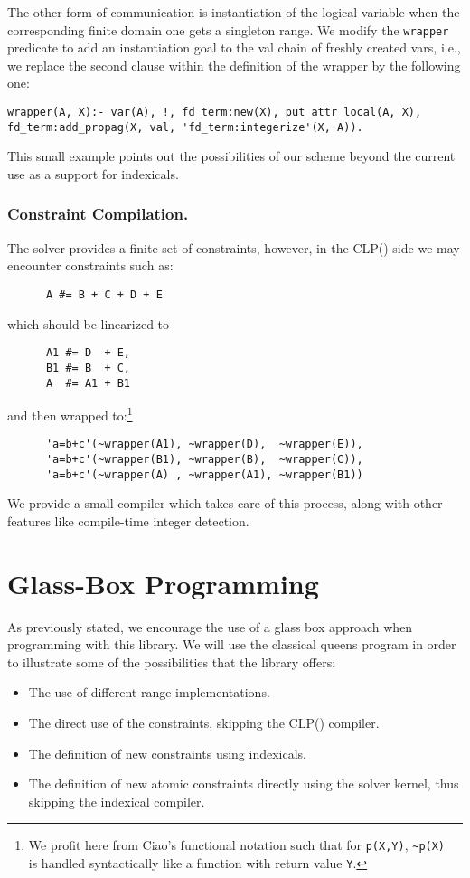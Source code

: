 \documentclass{llncs}
\newcommand{\clpfd}{CLP()\xspace}
\newcommand{\fd}{\xspace}
\begin{document}
The other form of communication is instantiation of the logical
variable when the corresponding finite domain one gets a singleton
range. We modify the \verb!wrapper! predicate to add an instantiation
goal to the val chain of freshly created \fd vars, i.e., we replace the
second clause within the definition of the wrapper by the following one:
\begin{lstlisting}
wrapper(A, X):- var(A), !, fd_term:new(X), put_attr_local(A, X),
fd_term:add_propag(X, val, 'fd_term:integerize'(X, A)).
\end{lstlisting}
This small example points out the possibilities of our scheme beyond
the current use as a support for indexicals.

\subsubsection{Constraint Compilation.}

The \fd solver provides a finite set of \fd constraints, however, in
the \clpfd side we may encounter constraints such as:
\begin{lstlisting}
      A #= B + C + D + E
\end{lstlisting}
which should be linearized to
\begin{lstlisting}
      A1 #= D  + E,
      B1 #= B  + C,
      A  #= A1 + B1
\end{lstlisting}
and then wrapped to:\footnote{We profit here from Ciao's functional
  notation such that for {\tt p(X,Y)}, {\tt \textasciitilde p(X) } is
  handled syntactically like a function with return value {\tt Y}.}
\begin{lstlisting}
      'a=b+c'(~wrapper(A1), ~wrapper(D),  ~wrapper(E)),
      'a=b+c'(~wrapper(B1), ~wrapper(B),  ~wrapper(C)),
      'a=b+c'(~wrapper(A) , ~wrapper(A1), ~wrapper(B1))
\end{lstlisting}
We provide a small compiler which takes care of this process, along
with other features like compile-time integer detection.

\section{Glass-Box Programming}
\label{sec:glass-box-effect}
As previously stated, we encourage the use of a glass box approach
when programming with this library. We will use the classical
queens program in order to illustrate some of the possibilities that
the library offers:
\begin{itemize}
\item The use of different range implementations.
\item The direct use of the \fd constraints, skipping the \clpfd compiler.
\item The definition of new \fd constraints using indexicals.
\item The definition of new atomic constraints directly using the
  solver kernel, thus skipping the indexical compiler.
\end{itemize}
\end{document}
